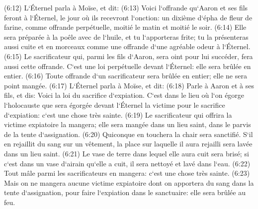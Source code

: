 \verse (6:12) L`Éternel parla à Moïse, et dit: 
\verse (6:13) Voici l`offrande qu`Aaron et ses fils feront à l`Éternel, le jour où ils recevront l`onction: un dixième d`épha de fleur de farine, comme offrande perpétuelle, moitié le matin et moitié le soir. 
\verse (6:14) Elle sera préparée à la poêle avec de l`huile, et tu l`apporteras frite; tu la présenteras aussi cuite et en morceaux comme une offrande d`une agréable odeur à l`Éternel. 
\verse (6:15) Le sacrificateur qui, parmi les fils d`Aaron, sera oint pour lui succéder, fera aussi cette offrande. C`est une loi perpétuelle devant l`Éternel: elle sera brûlée en entier. 
\verse (6:16) Toute offrande d`un sacrificateur sera brûlée en entier; elle ne sera point mangée. 
\verse (6:17) L`Éternel parla à Moïse, et dit: 
\verse (6:18) Parle à Aaron et à ses fils, et dis: Voici la loi du sacrifice d`expiation. C`est dans le lieu où l`on égorge l`holocauste que sera égorgée devant l`Éternel la victime pour le sacrifice d`expiation: c`est une chose très sainte. 
\verse (6:19) Le sacrificateur qui offrira la victime expiatoire la mangera; elle sera mangée dans un lieu saint, dans le parvis de la tente d`assignation. 
\verse (6:20) Quiconque en touchera la chair sera sanctifié. S`il en rejaillit du sang sur un vêtement, la place sur laquelle il aura rejailli sera lavée dans un lieu saint. 
\verse (6:21) Le vase de terre dans lequel elle aura cuit sera brisé; si c`est dans un vase d`airain qu`elle a cuit, il sera nettoyé et lavé dans l`eau. 
\verse (6:22) Tout mâle parmi les sacrificateurs en mangera: c`est une chose très sainte. 
\verse (6:23) Mais on ne mangera aucune victime expiatoire dont on apportera du sang dans la tente d`assignation, pour faire l`expiation dans le sanctuaire: elle sera brûlée au feu. 

